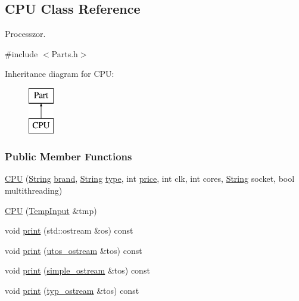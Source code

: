 \subsection{C\+PU Class Reference}
\label{class_c_p_u}


Processzor.  




{\ttfamily \#include $<$Parts.\+h$>$}

Inheritance diagram for C\+PU\+:\begin{figure}[H]
\begin{center}
\leavevmode
\includegraphics[height=2.000000cm]{class_c_p_u}
\end{center}
\end{figure}
\subsubsection*{Public Member Functions}
\begin{DoxyCompactItemize}
\item 
\mbox{\hyperlink{class_c_p_u_a1aa85a6c976fe5b665dcb9fd6d8fdd1e}{C\+PU}} (\mbox{\hyperlink{class_string}{String}} \mbox{\hyperlink{class_part_ae06f2fdeb7fbbdb229a7aca151f3e341}{brand}}, \mbox{\hyperlink{class_string}{String}} \mbox{\hyperlink{class_part_a101dbcc5c4b21564df7414c7eb0eae88}{type}}, int \mbox{\hyperlink{class_part_a8e71223aed1da95a974f33d8d6c91bb1}{price}}, int clk, int cores, \mbox{\hyperlink{class_string}{String}} socket, bool multithreading)
\item 
\mbox{\hyperlink{class_c_p_u_a9147d84f815b9a242ba618877e6b2673}{C\+PU}} (\mbox{\hyperlink{struct_temp_input}{Temp\+Input}} \&tmp)
\item 
void \mbox{\hyperlink{class_c_p_u_ad4d3ebb288deeaad640e034bdb71a40a}{print}} (std\+::ostream \&os) const
\item 
void \mbox{\hyperlink{class_c_p_u_a0aea700bac0896b9e4434770737078d0}{print}} (\mbox{\hyperlink{structutos__ostream}{utos\+\_\+ostream}} \&tos) const
\item 
void \mbox{\hyperlink{class_c_p_u_a2f130a0263e32387554c128aedb6f9ed}{print}} (\mbox{\hyperlink{structsimple__ostream}{simple\+\_\+ostream}} \&tos) const
\item 
void \mbox{\hyperlink{class_c_p_u_aa2cf81d7f0005da72c7a99b1b9459c27}{print}} (\mbox{\hyperlink{structtyp__ostream}{typ\+\_\+ostream}} \&tos) const
\end{DoxyCompactItemize}
